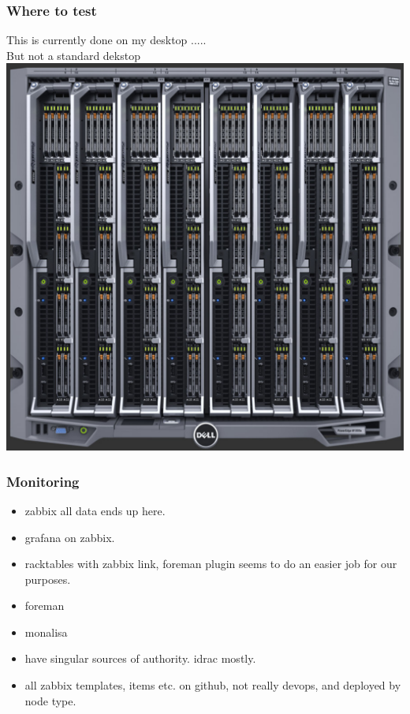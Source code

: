 \documentclass{beamer}
\begin{document}
\begin{frame}
    \frametitle{Where to test}
    This is currently done on my desktop .....\\
    But not a standard dekstop
    \includegraphics[scale=0.25]{M1000e.pdf}
\end{frame}
\begin{frame}
  \frametitle{Monitoring}
  \begin{itemize}
    \item zabbix all data ends up here.
    \item grafana on zabbix.
    \item racktables with zabbix link, foreman plugin seems to do an easier job for our purposes.
    \item foreman
    \item monalisa
    \item have singular sources of authority. idrac mostly.
    \item all zabbix templates, items etc. on github, not really devops, and deployed by node type.
  \end{itemize}
\end{frame}
\end{document}
